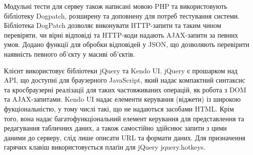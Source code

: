 Модульні тести для сервеу також написані мовою PHP та використовують бібліотеку Dogpatch, розширену та доповнену для потреб тестування системи. Бібліотека DogPatch дозволяє виконувати HTTP-запити та таким чином перевіряти, чи вірні відповіді та HTTP-коди надають AJAX-запити за певних умов. Додано функції для обробки відповідей у JSON, що дозволяють перевірити наявність певного об'єкту у масиві об'єктів.

Клієнт використовує бібліотеки jQuery та Kendo UI. jQuery є прошарком над API, що доступні для браузерного JavaScript, який надає компактний синтаксис та кросбраузерні реалізації для таких частовживаних операцій, як робота з DOM та AJAX-запитами. Kendo UI надає елементи керування (віджети) із широкою фукціональністю, у тому числі такі, що не надаються засобами HTML. Крім того, вона надає багатофункціональний елемент керування для представлення та редагування табличних даних, а також самостійно здійснює запити з цими даними до серверу, слід лише описати URL та формати даних. Для призначення гарячих клавіш використовується плаґін для jQuery jquery.hotkeys.
\bigbreak
